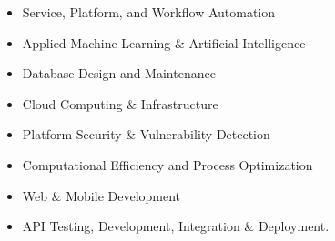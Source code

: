 \documentclass[9pt]{developercv}
\begin{document}
\begin{minipage}[t]{0.49\textwidth}
    \vspace{-\baselineskip}
\vspace{-6pt}
\begin{itemize}[itemsep=2pt,topsep=0pt,parsep=0pt,partopsep=0pt, leftmargin=2em]
\item Service, Platform, and Workflow Automation
\item Applied Machine Learning \& Artificial Intelligence
\item Database Design and Maintenance
\item Cloud Computing \& Infrastructure
\item Platform Security \& Vulnerability Detection
\item Computational Efficiency and Process Optimization
\item Web \& Mobile Development
\item API Testing, Development, Integration \& Deployment.


\end{itemize}
\end{minipage}
\end{document}
